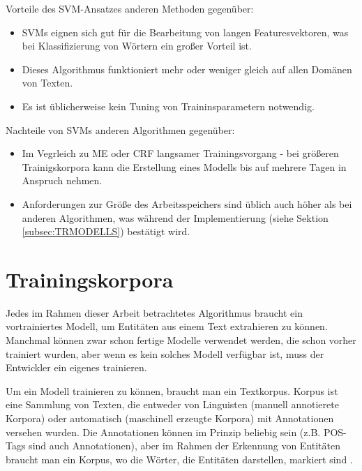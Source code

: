 Vorteile des SVM-Ansatzes anderen Methoden gegenüber\cite{joachims1998text}:
\begin{itemize}
\item SVMs eignen sich gut für die Bearbeitung von langen Featuresvektoren, was bei Klassifizierung von Wörtern ein großer Vorteil ist.
\item Dieses Algorithmus funktioniert mehr oder weniger gleich auf allen Domänen von Texten.
\item Es ist üblicherweise kein Tuning von Traininsparametern notwendig.
\end{itemize}

Nachteile von SVMs anderen Algorithmen gegenüber:
\begin{itemize}
\item Im Vegrleich zu ME oder CRF langsamer Trainingsvorgang - bei größeren Trainigskorpora kann die Erstellung eines Modells bis auf mehrere Tagen in Anspruch nehmen.
\item Anforderungen zur Größe des Arbeitsspeichers sind üblich auch höher als bei anderen Algorithmen, was während der Implementierung (siehe Sektion \ref{subsec:TRMODELLS}) bestätigt wird.
\end{itemize}

\section{Trainingskorpora} \label{sec:trcorpora}
Jedes im Rahmen dieser Arbeit betrachtetes Algorithmus braucht ein vortrainiertes Modell, um Entitäten aus einem Text extrahieren zu können. Manchmal können zwar schon fertige Modelle verwendet werden, die schon vorher trainiert wurden, aber wenn es kein solches Modell verfügbar ist, muss der Entwickler ein eigenes trainieren.

Um ein Modell trainieren zu können, braucht man ein Textkorpus. Korpus ist eine Sammlung von Texten, die entweder von Linguisten (manuell annotierete Korpora) oder automatisch (maschinell erzeugte Korpora) mit Annotationen versehen wurden. Die Annotationen können im Prinzip beliebig sein (z.B. POS-Tags sind auch Annotationen), aber im Rahmen der Erkennung von Entitäten braucht man ein Korpus, wo die Wörter, die Entitäten darstellen, markiert sind \cite{naf2006korpuslinguistik}.

